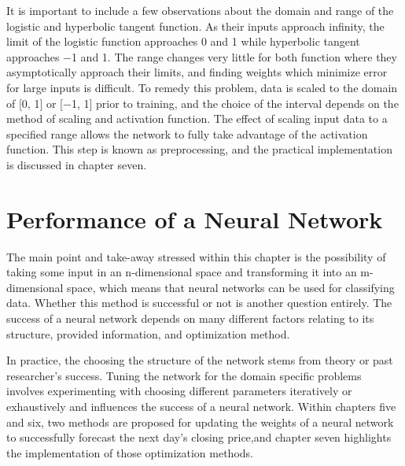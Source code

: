 \documentclass[../main.tex]{subfiles}
\begin{document}
    It is important to include a few observations about the domain and range of the logistic and hyperbolic tangent function.
    As their inputs approach infinity, the limit of the logistic function approaches 0 and 1 while hyperbolic tangent approaches −1 and 1.
    The range changes very little for both function where they asymptotically approach their limits, and finding weights which minimize error for large inputs is difficult.
    To remedy this problem, data is scaled to the domain of [0, 1] or [−1, 1] prior to training, and the choice of the interval depends on the method of scaling and activation function.
    The effect of scaling input data to a specified range allows the network to fully take advantage of the activation function.
    This step is known as preprocessing, and the practical implementation is discussed in chapter seven.

    \section{Performance of a Neural Network}\label{sec:performance-of-a-neural-network}
    The main point and take-away stressed within this chapter is the possibility of taking some input in an n-dimensional space and transforming it into an m-dimensional space, which means that neural networks can be used for classifying data.
    Whether this method is successful or not is another question entirely.
    The success of a neural network depends on many different factors relating to its structure, provided information, and optimization method.

    In practice, the choosing the structure of the network stems from theory or past researcher’s success.
    Tuning the network for the domain specific problems involves experimenting with choosing different parameters iteratively or exhaustively and influences the success of a neural network.
    Within chapters five and six, two methods are proposed for updating the weights of a neural network to successfully forecast the next day's closing price,and chapter seven highlights the implementation of those optimization methods.
\end{document}

